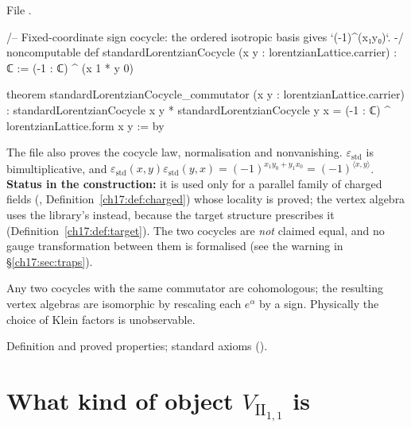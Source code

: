 \noindent File .
\begin{leancode}
/-- Fixed-coordinate sign cocycle: the ordered isotropic basis gives `(-1)^(x₁y₀)`. -/
noncomputable def standardLorentzianCocycle (x y : lorentzianLattice.carrier) : ℂ :=
  (-1 : ℂ) ^ (x 1 * y 0)

theorem standardLorentzianCocycle_commutator (x y : lorentzianLattice.carrier) :
    standardLorentzianCocycle x y * standardLorentzianCocycle y x =
      (-1 : ℂ) ^ lorentzianLattice.form x y := by
\end{leancode}

\begin{dictionary}
The file also proves the cocycle law, normalisation and nonvanishing.  $\varepsilon_{\mathrm{std}}$ is
bimultiplicative, and $\varepsilon_{\mathrm{std}}(x,y)\varepsilon_{\mathrm{std}}(y,x)=(-1)^{x_1y_0+y_1x_0}=(-1)^{\langle x,y\rangle}$.
\textbf{Status in the construction:} it is used only for a parallel family of charged fields
(, Definition~\ref{ch17:def:charged}) whose locality is proved; the vertex
algebra  uses the library's  instead, because the target
structure prescribes it (Definition~\ref{ch17:def:target}).  The two cocycles are \emph{not} claimed equal,
and no gauge transformation between them is formalised (see the warning in \S\ref{ch17:sec:traps}).
\end{dictionary}

\begin{physics}
Any two cocycles with the same commutator are cohomologous; the resulting vertex algebras are isomorphic
by rescaling each $e^\alpha$ by a sign.  Physically the choice of Klein factors is unobservable.
\end{physics}

\begin{status}
Definition and proved properties; standard axioms ().
\end{status}

\section{What kind of object \texorpdfstring{$V_{\mathrm{II}_{1,1}}$}{V(II(1,1))} is}\label{ch17:sec:target}

